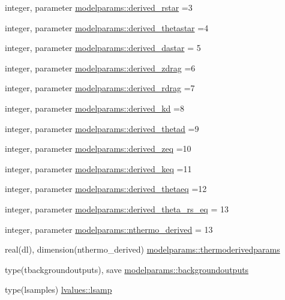 \begin{DoxyCompactItemize}
\item 
integer, parameter \mbox{\hyperlink{namespacemodelparams_a0a96c00fb37f393bad015179acb69747}{modelparams\+::derived\+\_\+rstar}} =3
\item 
integer, parameter \mbox{\hyperlink{namespacemodelparams_af8cbef6429fb7ceac03aa8fe7d0d9875}{modelparams\+::derived\+\_\+thetastar}} =4
\item 
integer, parameter \mbox{\hyperlink{namespacemodelparams_a81273461b08fe58e73e36d844c62fe7f}{modelparams\+::derived\+\_\+dastar}} = 5
\item 
integer, parameter \mbox{\hyperlink{namespacemodelparams_a9a7e7cdc5d12b5f40bff2ae559319e44}{modelparams\+::derived\+\_\+zdrag}} =6
\item 
integer, parameter \mbox{\hyperlink{namespacemodelparams_a902eadf9e7fd31eb1ebd3e02ac0e443b}{modelparams\+::derived\+\_\+rdrag}} =7
\item 
integer, parameter \mbox{\hyperlink{namespacemodelparams_a709313f88097e1ea1da03d031977d39d}{modelparams\+::derived\+\_\+kd}} =8
\item 
integer, parameter \mbox{\hyperlink{namespacemodelparams_aa8c5e706aaaef69a8fa8e0230f1242d3}{modelparams\+::derived\+\_\+thetad}} =9
\item 
integer, parameter \mbox{\hyperlink{namespacemodelparams_a47dbe62349dd11d37540763b6dc4e630}{modelparams\+::derived\+\_\+zeq}} =10
\item 
integer, parameter \mbox{\hyperlink{namespacemodelparams_a9158352b05bd5c94db9c9f39b728b8af}{modelparams\+::derived\+\_\+keq}} =11
\item 
integer, parameter \mbox{\hyperlink{namespacemodelparams_aa10d4b47c739162ede20adf21b82dcb7}{modelparams\+::derived\+\_\+thetaeq}} =12
\item 
integer, parameter \mbox{\hyperlink{namespacemodelparams_acba5f72246541278ec6edcb88ebc2197}{modelparams\+::derived\+\_\+theta\+\_\+rs\+\_\+eq}} = 13
\item 
integer, parameter \mbox{\hyperlink{namespacemodelparams_a3763c4095d154f01def46dfce33faffd}{modelparams\+::nthermo\+\_\+derived}} = 13
\item 
real(dl), dimension(nthermo\+\_\+derived) \mbox{\hyperlink{namespacemodelparams_a81091ac7021dd731decc138dc9886329}{modelparams\+::thermoderivedparams}}
\item 
type(tbackgroundoutputs), save \mbox{\hyperlink{namespacemodelparams_ad4f70e5f61b1f44ff823eb7f25e96b45}{modelparams\+::backgroundoutputs}}
\item 
type(lsamples) \mbox{\hyperlink{namespacelvalues_ae00efa8263b3dcff6d82e34d4102a808}{lvalues\+::lsamp}}

\end{DoxyCompactItemize}
